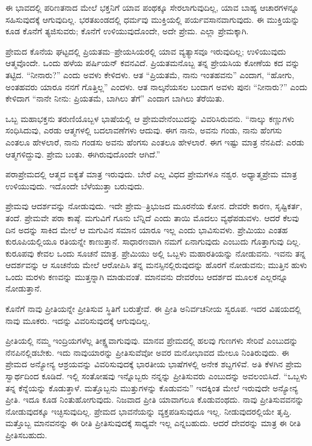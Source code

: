 ಈ ಭಾವದಲ್ಲಿ ಪರಿಣತನಾದ ಮೇಲೆ ಭಕ್ತನಿಗೆ ಯಾವ ಪಂಥಕ್ಕೂ ಸೇರಲಾಗುವುದಿಲ್ಲ, ಯಾವ ಬಾಹ್ಯ ಆಚಾರಗಳನ್ನೂ ಸಹಿಸುವುದಕ್ಕೆ ಆಗುವುದಿಲ್ಲ. ಭರತಖಂಡದಲ್ಲಿ ಧರ್ಮವು ಮುಕ್ತಿಯಲ್ಲಿ ಪರ್ಯವಸಾನವಾಗುವುದು. ಈ ಮುಕ್ತಿಯನ್ನು ಕೂಡ ಕೊನೆಗೆ ತ್ಯಜಿಸುವರು; ಕೊನೆಗೆ ಉಳಿಯುವುದೊಂದೇ, ಅದೇ ಪ್ರೇಮ. ಎಲ್ಲಾ ಪ್ರೇಮಕ್ಕಾಗಿ.

ಪ್ರೇಮದ ಕೊನೆಯ ಘಟ್ಟದಲ್ಲಿ ಪ್ರಿಯತಮ–ಪ್ರೇಯಸಿಯರಲ್ಲಿ ಯಾವ ವ್ಯತ್ಯಾಸವೂ ಇರುವುದಿಲ್ಲ; ಉಳಿಯುವುದು ಆತ್ಮವೊಂದೇ. ಒಂದು ಹಳೆಯ ಪರ್ಷಿಯನ್​ ಕವನವಿದೆ. ಪ್ರಿಯತಮನೊಬ್ಬ ತನ್ನ ಪ್ರೇಯಸಿಯ ಕೋಣೆಯ ಕದ ವನ್ನು ತಟ್ಟಿದ. “ನೀನಾರು?” ಎಂದು ಅವಳು ಕೇಳಿದಳು. ಆತ “ಪ್ರಿಯತಮೆ, ನಾನು ಇಂತಹವನು” ಎಂದಾಗ, “ಹೋಗು, ಅಂತಹವರು ಯಾರೂ ನನಗೆ ಗೊತ್ತಿಲ್ಲ” ಎಂದಳು. ಆತ ನಾಲ್ಕನೆಯಸಲ ಬಂದಾಗ ಅವಳು ಪುನಃ “ನೀನಾರು?” ಎಂದು ಕೇಳಿದಾಗ “ನಾನೇ ನೀನು: ಪ್ರಿಯತಮೆ, ಬಾಗಿಲು ತೆಗೆ” ಎಂದಾಗ ಬಾಗಿಲು ತೆರೆಯಿತು.

ಒಬ್ಬ ಮಹಾಭಕ್ತನು ತರುಣಿಯೊಬ್ಬಳ ಭಾಷೆಯಲ್ಲಿ ಆ ಪ್ರೇಮವೇನೆಂಬುದನ್ನು ವಿವರಿಸಿರುವನು. “ನಾಲ್ಕು ಕಣ್ಣುಗಳು ಸಂಧಿಸಿದುವು, ಎರಡು ಆತ್ಮಗಳಲ್ಲಿ ಬದಲಾವಣೆಗಳು ಆದುವು. ಈಗ ನಾನು, ಅವನು ಗಂಡು, ನಾನು ಹೆಂಗಸು ಎಂತಲೂ ಹೇಳಲಾರೆ, ನಾನು ಗಂಡಸು ಅವನು ಹೆಂಗಸು ಎಂತಲೂ ಹೇಳಲಾರೆ. ಈಗ ಇಷ್ಟು ಮಾತ್ರ ನೆನಪಿದೆ: ಎರಡು ಆತ್ಮಗಳಿದ್ದುವು. ಪ್ರೇಮ ಬಂತು. ಈಗಿರುವುದೊಂದೇ ಆಗಿದೆ.”

ಪರಾಪ್ರೇಮದಲ್ಲಿ ಆತ್ಮದ ಐಕ್ಯತೆ ಮಾತ್ರ ಇರುವುದು. ಬೇರೆ ಎಲ್ಲ ವಿಧದ ಪ್ರೇಮಗಳೂ ನಶ್ವರ. ಅಧ್ಯಾತ್ಮಪ್ರೇಮ ಮಾತ್ರ ಉಳಿಯುವುದು. ಇದೊಂದೇ ಬೆಳೆಯುತ್ತಾ ಬರುವುದು.

ಪ್ರೇಮವು ಆದರ್ಶವನ್ನು ನೋಡುವುದು. ಇದೇ ಪ್ರೇಮ–ತ್ರಿಭುಜದ ಮೂರನೆಯ ಕೋನ. ದೇವರೇ ಕಾರಣ, ಸೃಷ್ಟಿಕರ್ತ, ತಂದೆ. ಪ್ರೇಮವೇ ಪರಾ ಕಾಷ್ಠೆ. ಮಗುವಿಗೆ ಗೂನು ಬೆನ್ನಿದೆ ಎಂದು ತಾಯಿ ಮೊದಲು ವ್ಯಥೆಪಡುವಳು. ಆದರೆ ಕೆಲವು ದಿನ ಅದನ್ನು ಸಾಕಿದ ಮೇಲೆ ಆ ಮಗುವಿನ ಸಮಾನ ಯಾರೂ ಇಲ್ಲ ಎಂದು ಭಾವಿಸುವಳು. ಪ್ರೇಮಿಯು ಎಂತಹ ಕುರೂಪಿಯಲ್ಲಿಯೂ ರತಿಯನ್ನೇ ಕಾಣುತ್ತಾನೆ. ಸಾಧಾರಣವಾಗಿ ನಮಗೆ ಏನಾಗುವುದು ಎಂಬುದು ಗೊತ್ತಾಗುವು ದಿಲ್ಲ. ಕುರೂಪವು ಕೇವಲ ಒಂದು ಸೂಚನೆ ಮಾತ್ರ. ಪ್ರೇಮಿಯು ಅಲ್ಲಿ ಒಬ್ಬಳು ಮಹಾರತಿಯನ್ನು ನೋಡುವನು. ಇವನು ತನ್ನ ಆದರ್ಶವನ್ನು ಆ ಸೂಚನೆಯ ಮೇಲೆ ಆರೋಪಿಸಿ ತನ್ನ ಮನಸ್ಸಿನಲ್ಲಿರುವುದನ್ನು ಹೊರಗೆ ನೋಡುವನು; ಮುತ್ತಿನ ಹುಳು ಒಂದು ಮರಳು ಕಣವನ್ನು ಮುತ್ತನ್ನಾಗಿ ಮಾಡುವಂತೆ. ಮಾನವನು ದೇವರೆಂಬ ಆದರ್ಶದ ಮೂಲಕ ಎಲ್ಲರನ್ನೂ ನೋಡುತ್ತಾನೆ.

ಕೊನೆಗೆ ನಾವು ಪ್ರೀತಿಯನ್ನೇ ಪ್ರೀತಿಸುವ ಸ್ಥಿತಿಗೆ ಬರುತ್ತೇವೆ. ಈ ಪ್ರೀತಿ ಅನಿರ್ವಚನೀಯ ಸ್ವರೂಪ. ಇದರ ವಿಷಯದಲ್ಲಿ ನಾವು ಮೂಕರು. ಇದನ್ನು ವಿವರಿಸುವುದಕ್ಕೆ ಆಗುವುದಿಲ್ಲ.

ಪ್ರೀತಿಯಲ್ಲಿ ನಮ್ಮ ಇಂದ್ರಿಯಗಳೆಲ್ಲ ತೀಕ್ಷ್ಣವಾಗುವುವು. ಮಾನವ ಪ್ರೇಮದಲ್ಲಿ ಹಲವು ಗುಣಗಳು ಸೇರಿವೆ ಎಂಬುದನ್ನು ನೆನಪಿನಲ್ಲಿಡಬೇಕು. ಇದು ನಾವುಯಾರನ್ನು ಪ್ರೀತಿಸುವೆವೋ ಅವರ ಮನೋಭಾವದ ಮೇಲೂ ನಿಂತಿರುವುದು. ಈ ಪ್ರೇಮದ ಅನ್ಯೋನ್ಯ ಆಶ್ರಯವನ್ನು ವಿವರಿಸುವುದಕ್ಕೆ ಭಾರತೀಯ ಭಾಷೆಗಳಲ್ಲಿ ಅನೇಕ ಶಬ್ದಗಳಿವೆ. ಅತಿ ಕೆಳಗಿನ ಪ್ರೇಮ ಸ್ವಾರ್ಥದಿಂದ ಕೂಡಿದೆ. ಇಲ್ಲಿ ಸಂತೋಷವು ಇನ್ನೊಬ್ಬರು ನನ್ನನ್ನು ಪ್ರೀತಿಸುವರು ಎಂಬುದನ್ನು ಅವಲಂಬಿಸಿದೆ. “ಒಬ್ಬಳು ತನ್ನ ಕೆನ್ನೆಯನ್ನು ಕೊಡುತ್ತಾಳೆ. ಮತ್ತೊಬ್ಬನು ಮುತ್ತುಗಳನ್ನು ಕೊಡುವನು” ಇದಕ್ಕಿಂತ ಮೇಲೆ ಇರುವುದೇ ಅನ್ಯೋನ್ಯ ಪ್ರೀತಿ. ಇದೂ ಕೂಡ ನಿಂತುಹೋಗುವುದು. ನಿಜವಾದ ಪ್ರೀತಿ ಯಾವಾಗಲೂ ಕೊಡುವಂಥದು. ನಾವು ಪ್ರೀತಿಸುವವನನ್ನು ನೋಡುವುದಕ್ಕೂ ಇಚ್ಛಿಸುವುದಿಲ್ಲ. ಪ್ರೇಮದ ಭಾವನೆಯನ್ನು ವ್ಯಕ್ತಪಡಿಸುವುದೂ ಇಲ್ಲ. ನೀಡುವುದರಲ್ಲಿಯೇ ತೃಪ್ತಿ. ಮತ್ತೊಬ್ಬ ಮಾನವನನ್ನು ಈ ರೀತಿ ಪ್ರೀತಿಸುವುದಕ್ಕೆ ಸಾಧ್ಯವೇ ಇಲ್ಲ ಎನ್ನಬಹುದು. ಆದರೆ ದೇವರನ್ನು ಮಾತ್ರ ಈ ರೀತಿ ಪ್ರೀತಿಸಬಹುದು.

